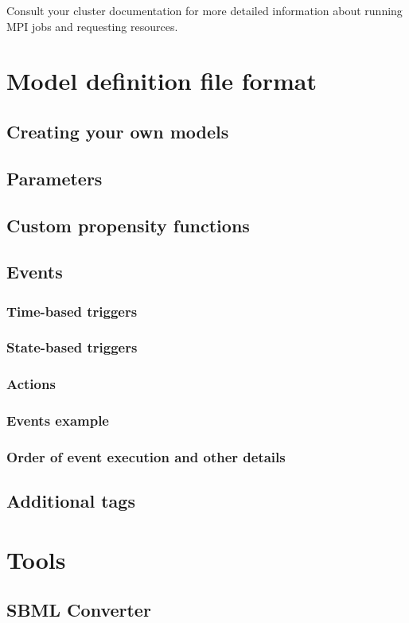 \documentclass[11pt,letterpaper]{article}
\begin{document}
Consult your cluster documentation for more detailed information about running MPI jobs and requesting resources.


\section{Model definition file format}
\subsection{Creating your own models}
\subsection{Parameters}
\subsection{Custom propensity functions}
\subsection{Events}
\subsubsection{Time-based triggers}
\subsubsection{State-based triggers}
\subsubsection{Actions}
\subsubsection{Events example}
\subsubsection{Order of event execution and other details}
\subsection{Additional tags}


\section{Tools}
\subsection{SBML Converter}
\end{document}

